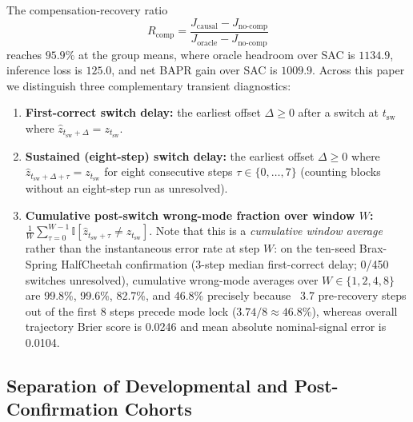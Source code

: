 The compensation-recovery ratio
\begin{equation}
 R_{\mathrm{comp}}=
 \frac{J_{\mathrm{causal}}-J_{\mathrm{no\text{-}comp}}}
 {J_{\mathrm{oracle}}-J_{\mathrm{no\text{-}comp}}}
\end{equation}
reaches $95.9\%$ at the group means, where oracle headroom over SAC is $1134.9$, inference loss is $125.0$, and net BAPR gain over SAC is $1009.9$. Across this paper we distinguish three complementary transient diagnostics:
\begin{enumerate}[leftmargin=*]
    \item \textbf{First-correct switch delay:} the earliest offset $\Delta\ge 0$ after a switch at $t_{\mathrm{sw}}$ where $\hat z_{t_{\mathrm{sw}}+\Delta}=z_{t_{\mathrm{sw}}}$.
    \item \textbf{Sustained (eight-step) switch delay:} the earliest offset $\Delta\ge 0$ where $\hat z_{t_{\mathrm{sw}}+\Delta+\tau}=z_{t_{\mathrm{sw}}}$ for eight consecutive steps $\tau\in\{0,\ldots,7\}$ (counting blocks without an eight-step run as unresolved).
    \item \textbf{Cumulative post-switch wrong-mode fraction over window $W$:} $\frac{1}{W}\sum_{\tau=0}^{W-1}\mathbb{I}[\hat z_{t_{\mathrm{sw}}+\tau}\ne z_{t_{\mathrm{sw}}}]$. Note that this is a \emph{cumulative window average} rather than the instantaneous error rate at step $W$: on the ten-seed Brax-Spring HalfCheetah confirmation (3-step median first-correct delay; 0/450 switches unresolved), cumulative wrong-mode averages over $W\in\{1,2,4,8\}$ are 99.8\%, 99.6\%, 82.7\%, and 46.8\% precisely because ~3.7 pre-recovery steps out of the first 8 steps precede mode lock ($3.74/8\approx 46.8\%$), whereas overall trajectory Brier score is 0.0246 and mean absolute nominal-signal error is 0.0104.
\end{enumerate}

\subsection{Separation of Developmental and Post-Confirmation Cohorts}

